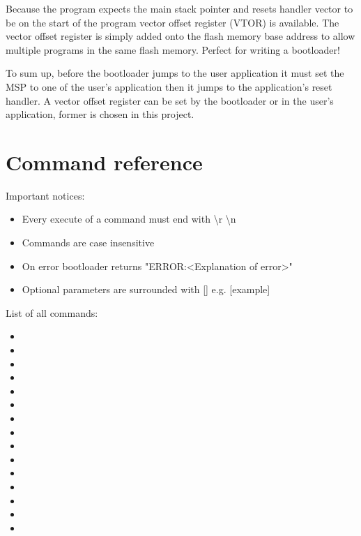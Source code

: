 Because the program expects the main stack pointer and resets handler vector to be on the start of the program vector offset register (VTOR) is available. The vector offset register is simply added onto the flash memory base address to allow multiple programs in the same flash memory. Perfect for writing a bootloader!

To sum up, before the bootloader jumps to the user application it must set the MSP to one of the user's application then it jumps to the application's reset handler. A vector offset register can be set by the bootloader or in the user's application, former is chosen in this project.

\section{Command reference}

Important notices:

\begin{itemize}
 \item Every execute of a command must end with \textbackslash r \textbackslash n

 \item Commands are case insensitive
 
 \item On error bootloader returns "ERROR:<Explanation of error>"
 
 \item Optional parameters are surrounded with [] e.g. [example]

\end{itemize}

\noindent List of all commands:

\begin{itemize}

    \item {}
    \item {}
    \item {}
    \item {}
    \item {}
    \item {}
    \item {}
    \item {}
    \item {}
    \item {} 
    \item {}
    \item {}
    \item {}
    \item {}
    \item {}

\end{itemize}



